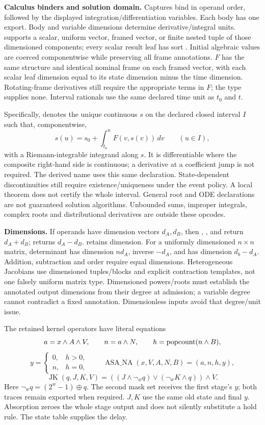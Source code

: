 \textbf{Calculus binders and solution domain.} Captures bind in operand order,
followed by the displayed integration/differentiation variables. Each body has
one export. Body and variable dimensions determine derivative/integral units.
 supports a scalar, uniform vector, framed vector, or finite nested tuple
of those dimensioned components; every scalar result leaf has sort
. Initial algebraic values are coerced componentwise while
preserving all frame annotations. $F$ has the same structure and identical
nominal frame on each framed vector, with each scalar leaf dimension equal to
its state dimension minus the time dimension. Rotating-frame derivatives still
require the appropriate terms in $F$; the type supplies none. Interval rationals
use the same declared time unit as $t_0$ and $t$.

Specifically,  denotes the unique continuous $s$ on the declared closed
interval $I$ such that, componentwise,
\[
 s(u)=s_0+\int_{t_0}^{u}F(v,s(v))\,dv\qquad(u\in I),
\]
with a Riemann-integrable integrand along $s$. It is differentiable where the
composite right-hand side is continuous; a derivative at a coefficient jump
is not required. The derived name  uses this same declaration.
State-dependent discontinuities still require existence/uniqueness under the
event policy. A local theorem does not certify the whole interval. General root
and ODE declarations are not guaranteed solution algorithms. Unbounded sums,
improper integrals, complex roots and distributional derivatives are outside
these opcodes.

\textbf{Dimensions.} If operands have dimension vectors $d_A,d_B$, then
, ,  and  return $d_A+d_B$;
 returns $d_A-d_B$.  retains dimension. For a uniformly
dimensioned $n\times n$ matrix, determinant has dimension $nd_A$, inverse
$-d_A$, and  has dimension $d_b-d_A$. Addition, subtraction
and order require equal dimensions. Heterogeneous Jacobians use dimensioned
tuples/blocks and explicit contraction templates, not one falsely uniform
matrix type. Dimensioned powers/roots must establish the annotated output
dimensions from their degree at admission; a variable degree cannot contradict
a fixed annotation. Dimensionless inputs avoid that degree/unit issue.

The retained kernel operators have literal equations
\[
 a=x\land A\land V,\qquad n=a\land N,\qquad h=\operatorname{popcount}(n\land B),
\]
\[
 y=\begin{cases}0,&h>0,\\n,&h=0,\end{cases}
 \qquad\operatorname{ASA\_NA}(x,V,A,N,B)=(a,n,h,y),
\]
\[
 \operatorname{JK}(q,J,K,V)=
 ((J\land\neg_w q)\lor(\neg_w K\land q))\land V.
\]
Here $\neg_wq=(2^w-1)\oplus q$. The second mask set receives the first stage's
$y$; both traces remain exported when required. $J,K$ use the same old state
and final $y$. Absorption zeroes the whole stage output and does not silently
substitute a hold rule. The state table supplies the delay.

